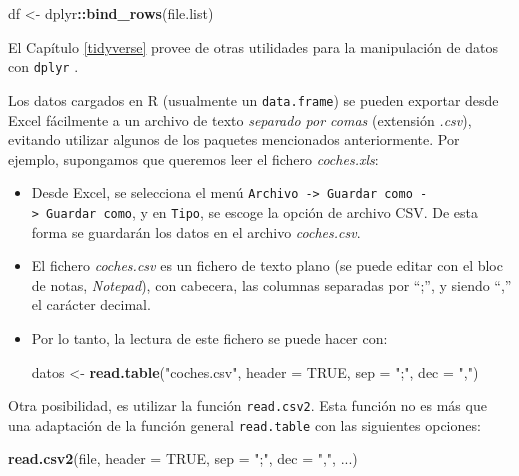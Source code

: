 \documentclass[
]{book}
\newenvironment{Shaded}{\begin{snugshade}}{\end{snugshade}}
\newcommand{\AttributeTok}[1]{\textcolor[rgb]{0.13,0.29,0.53}{#1}}
\newcommand{\ConstantTok}[1]{\textcolor[rgb]{0.56,0.35,0.01}{#1}}
\newcommand{\FunctionTok}[1]{\textcolor[rgb]{0.13,0.29,0.53}{\textbf{#1}}}
\newcommand{\NormalTok}[1]{#1}
\newcommand{\OtherTok}[1]{\textcolor[rgb]{0.56,0.35,0.01}{#1}}
\newcommand{\SpecialCharTok}[1]{\textcolor[rgb]{0.81,0.36,0.00}{\textbf{#1}}}
\newcommand{\StringTok}[1]{\textcolor[rgb]{0.31,0.60,0.02}{#1}}
\theoremstyle{break}
\theoremstyle{nonumberplain}
\begin{document}
\begin{Shaded}
\begin{Highlighting}[]
\NormalTok{df }\OtherTok{\textless{}{-}}\NormalTok{ dplyr}\SpecialCharTok{::}\FunctionTok{bind\_rows}\NormalTok{(file.list)}
\end{Highlighting}
\end{Shaded}

El Capítulo \ref{tidyverse} provee de otras utilidades para la manipulación de datos con \texttt{dplyr} \citep{R-dplyr}.

Los datos cargados en R (usualmente un \texttt{data.frame}) se pueden exportar desde Excel fácilmente a un archivo de texto \emph{separado por comas} (extensión \emph{.csv}), evitando utilizar algunos de los paquetes mencionados anteriormente.
Por ejemplo, supongamos que queremos leer el fichero \emph{coches.xls}:

\begin{itemize}
\item
  Desde Excel, se selecciona el menú \texttt{Archivo\ -\textgreater{}\ Guardar\ como\ -\textgreater{}\ Guardar\ como}, y en \texttt{Tipo}, se escoge la opción de archivo CSV. De esta forma se guardarán los datos en el archivo \emph{coches.csv}.
\item
  El fichero \emph{coches.csv} es un fichero de texto plano (se puede
  editar con el bloc de notas, \emph{Notepad}), con cabecera, las columnas separadas por ``;'', y siendo ``,'' el carácter decimal.
\item
  Por lo tanto, la lectura de este fichero se puede hacer con:

\begin{Shaded}
\begin{Highlighting}[]
\NormalTok{datos }\OtherTok{\textless{}{-}} \FunctionTok{read.table}\NormalTok{(}\StringTok{"coches.csv"}\NormalTok{, }\AttributeTok{header =} \ConstantTok{TRUE}\NormalTok{, }
                    \AttributeTok{sep =} \StringTok{";"}\NormalTok{, }\AttributeTok{dec =} \StringTok{","}\NormalTok{)}
\end{Highlighting}
\end{Shaded}
\end{itemize}

Otra posibilidad, es utilizar la función \texttt{read.csv2}. Esta función no es más que una adaptación de la función general \texttt{read.table} con las siguientes
opciones:

\begin{Shaded}
\begin{Highlighting}[]
\FunctionTok{read.csv2}\NormalTok{(file, }\AttributeTok{header =} \ConstantTok{TRUE}\NormalTok{, }\AttributeTok{sep =} \StringTok{";"}\NormalTok{, }\AttributeTok{dec =} \StringTok{","}\NormalTok{, ...)}
\end{Highlighting}
\end{Shaded}
\end{document}
